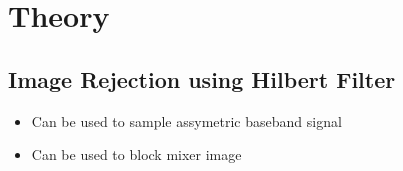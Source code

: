 \chapter{Theory}
\section{Image Rejection using Hilbert Filter}
\begin{itemize}
\item Can be used to sample assymetric baseband signal
\item Can be used to block mixer image
\end{itemize}
